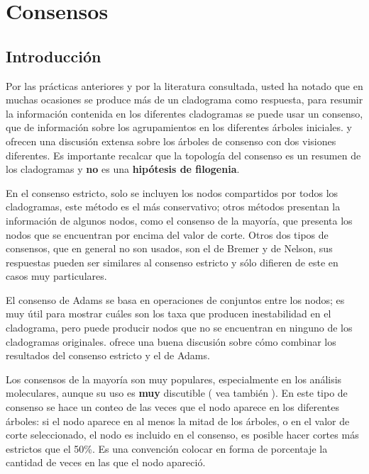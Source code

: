 \chapter{Consensos}
\label{cha:consenso}


\section*{Introducci\'on}

Por las pr\'acticas anteriores y por la literatura consultada, usted ha notado que en muchas ocasiones se produce m\'as de un cladograma como respuesta, para resumir la informaci\'on contenida en los diferentes cladogramas se puede usar un consenso, que de informaci\'on sobre los agrupamientos en los diferentes \'arboles iniciales. \cite{Swofford1991} y \cite{NixonCarpenter1996} ofrecen una discusi\'on extensa sobre los \'arboles de consenso con dos visiones diferentes. Es importante recalcar que la topolog\'ia del consenso es un resumen de los cladogramas y \textbf{no} es una \textbf{hip\'otesis de filogenia}.


En el consenso estricto, solo se incluyen los nodos compartidos por todos los cladogramas, este m\'etodo es el m\'as conservativo; otros m\'etodos presentan la informaci\'on de algunos nodos, como el consenso de la mayor\'ia, que presenta los nodos que se encuentran por encima del valor de corte. Otros dos tipos de consensos, que en general no son usados, son el de Bremer y de Nelson, sus respuestas pueden ser similares al consenso estricto y s\'olo difieren de este en casos muy particulares.


El consenso de Adams se basa en operaciones de conjuntos entre los nodos; es muy \'util para mostrar cu\'ales son los taxa que producen inestabilidad en el cladograma, pero puede producir nodos que no se encuentran en ninguno de los cladogramas originales. \cite{Kearney2002} ofrece una buena discusi\'on sobre c\'omo combinar los resultados del consenso estricto y el de Adams.

Los consensos de la mayor\'ia son muy populares, especialmente en los an\'alisis moleculares, aunque su uso es \textbf{muy} discutible (\cite{Sharkey2001} vea tambi\'en \cite{Goloboff2005}). En este tipo de consenso se hace un conteo de las veces que el nodo aparece en los diferentes \'arboles: si el nodo aparece en al menos la mitad de los \'arboles, o en el valor de corte seleccionado, el nodo es incluido en el consenso, es posible hacer cortes m\'as estrictos que el 50\%. Es una convenci\'on colocar en forma de porcentaje la cantidad de veces en las que el nodo apareci\'o.


